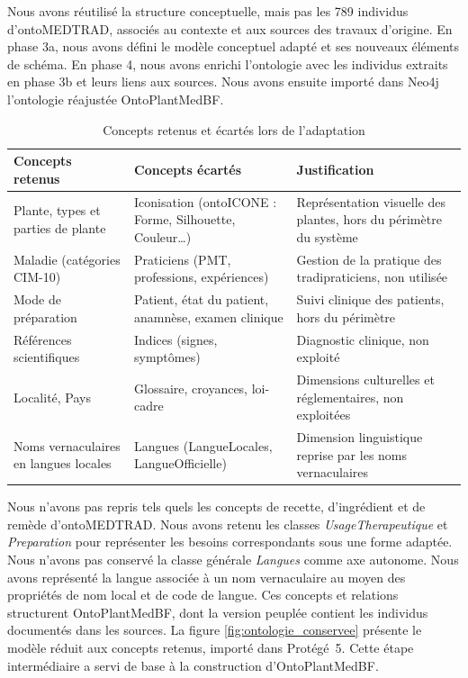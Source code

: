 Nous avons réutilisé la structure conceptuelle, mais pas les 789 individus d'ontoMEDTRAD, associés au contexte et aux sources des travaux d'origine. En phase 3a, nous avons défini le modèle conceptuel adapté et ses nouveaux éléments de schéma. En phase 4, nous avons enrichi l'ontologie avec les individus extraits en phase 3b et leurs liens aux sources. Nous avons ensuite importé dans Neo4j l'ontologie réajustée OntoPlantMedBF.

\begin{table}[H]
\centering
\caption{Concepts retenus et écartés lors de l'adaptation}
\label{tab:concepts_retenus_ecartes}
\begin{tabular}{|L{3.5cm}|L{5cm}|L{6.3cm}|}
\hline
\textbf{Concepts retenus} & \textbf{Concepts écartés} & \textbf{Justification} \\
\hline
Plante, types et parties de plante & Iconisation (ontoICONE : Forme, Silhouette, Couleur\dots) & Représentation visuelle des plantes, hors du périmètre du système \\
\hline
Maladie (catégories CIM-10) & Praticiens (PMT, professions, expériences) & Gestion de la pratique des tradipraticiens, non utilisée \\
\hline
Mode de préparation & Patient, état du patient, anamnèse, examen clinique & Suivi clinique des patients, hors du périmètre \\
\hline
Références scientifiques & Indices (signes, symptômes) & Diagnostic clinique, non exploité \\
\hline
Localité, Pays & Glossaire, croyances, loi-cadre & Dimensions culturelles et réglementaires, non exploitées \\
\hline
Noms vernaculaires en langues locales & Langues (LangueLocales, LangueOfficielle) & Dimension linguistique reprise par les noms vernaculaires \\
\hline
\end{tabular}
\end{table}

Nous n'avons pas repris tels quels les concepts de recette, d'ingrédient et de remède d'ontoMEDTRAD. Nous avons retenu les classes \textit{UsageTherapeutique} et \textit{Preparation} pour représenter les besoins correspondants sous une forme adaptée. Nous n'avons pas conservé la classe générale \textit{Langues} comme axe autonome. Nous avons représenté la langue associée à un nom vernaculaire au moyen des propriétés de nom local et de code de langue. Ces concepts et relations structurent OntoPlantMedBF, dont la version peuplée contient les individus documentés dans les sources. La figure \ref{fig:ontologie_conservee} présente le modèle réduit aux concepts retenus, importé dans Protégé~5. Cette étape intermédiaire a servi de base à la construction d'OntoPlantMedBF.

